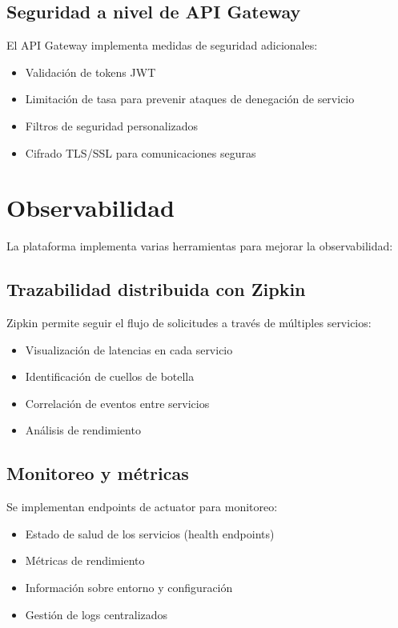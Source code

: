 \documentclass[12pt,a4paper]{report}
\begin{document}
\subsection{Seguridad a nivel de API Gateway}
El API Gateway implementa medidas de seguridad adicionales:

\begin{itemize}
    \item Validación de tokens JWT
    \item Limitación de tasa para prevenir ataques de denegación de servicio
    \item Filtros de seguridad personalizados
    \item Cifrado TLS/SSL para comunicaciones seguras
\end{itemize}

\section{Observabilidad}
La plataforma implementa varias herramientas para mejorar la observabilidad:

\subsection{Trazabilidad distribuida con Zipkin}
Zipkin permite seguir el flujo de solicitudes a través de múltiples servicios:

\begin{itemize}
    \item Visualización de latencias en cada servicio
    \item Identificación de cuellos de botella
    \item Correlación de eventos entre servicios
    \item Análisis de rendimiento
\end{itemize}

\subsection{Monitoreo y métricas}
Se implementan endpoints de actuator para monitoreo:

\begin{itemize}
    \item Estado de salud de los servicios (health endpoints)
    \item Métricas de rendimiento
    \item Información sobre entorno y configuración
    \item Gestión de logs centralizados
\end{itemize}
\end{document}
